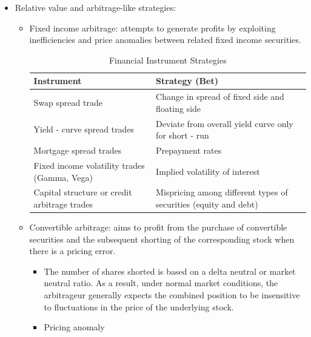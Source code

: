 \begin{itemize}
\begin{itemize}
    \item There is some evidence of nonlinearity between the two return series, particularly at the extreme tails (mostly as tail risk that shows up under extreme market conditions).
    \item Unlike trend followers, who tend to benefit from extreme moves, event-driven funds are hurt by extreme moves.
    \end{itemize}
\item Relative value and arbitrage-like strategies:
    \begin{itemize}
    \item Fixed income arbitrage: attempts to generate profits by exploiting inefficiencies and price anomalies between related fixed income securities.
    
    \begin{table}[h]
        \centering
        \caption{Financial Instrument Strategies}
        \begin{tabular}{@{}lp{7cm}@{}}
            \toprule
            Instrument & Strategy (Bet) \\
            \midrule
            Swap spread trade & Change in spread of fixed side and floating side \\
            Yield - curve spread trades & Deviate from overall yield curve only for short - run \\
            Mortgage spread trades & Prepayment rates \\
            Fixed income volatility trades (Gamma, Vega) & Implied volatility of interest \\
            Capital structure or credit arbitrage trades & Mispricing among different types of securities (equity and debt) \\
            \bottomrule
        \end{tabular}
    \end{table}
    \item Convertible arbitrage: aims to profit from the purchase of convertible securities and the subsequent shorting of the corresponding stock when there is a pricing error.
        \begin{itemize}
        \item The number of shares shorted is based on a delta neutral or market neutral ratio. As a result, under normal market conditions, the arbitrageur generally expects the combined position to be insensitive to fluctuations in the price of the underlying stock.
        \item Pricing anomaly

\end{itemize}
\end{itemize}
\end{itemize}
